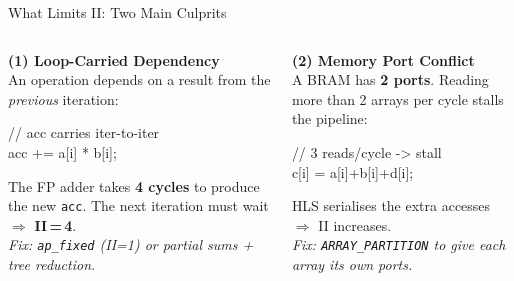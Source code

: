 \documentclass[aspectratio=169,12pt]{beamer}
\begin{document}
\begin{frame}{What Limits II: Two Main Culprits}
\vspace{0.1cm}
\begin{columns}[T,totalwidth=\textwidth]

  \colorbox{Orange!10}{\parbox{\dimexpr\linewidth-2\fboxsep\relax}{\vspace{4pt}
    {\color{Orange}\bfseries\normalsize \textbf{(1)} Loop-Carried Dependency}\\[4pt]
    {\small An operation depends on a result from the \emph{previous} iteration:}
    \vspace{2pt}
    \colorbox{NavyDk!6}{\parbox{\dimexpr\linewidth-4\fboxsep\relax}{\vspace{2pt}
      {\ttfamily\small\color{MidGray}// acc carries iter-to-iter}\\
      {\ttfamily\small acc += a[i] * b[i];}
    \vspace{2pt}}}
    {\small\color{Navy} The FP adder takes \textbf{4 cycles} to produce the new \texttt{acc}.
    The next iteration must wait $\Rightarrow$ \textbf{II\,=\,4}.}\\[4pt]
    {\small\itshape\color{MidGray}Fix: \texttt{ap\_fixed} (II=1) or partial sums + tree reduction.}
  \vspace{4pt}}}


  \colorbox{Teal!10}{\parbox{\dimexpr\linewidth-2\fboxsep\relax}{\vspace{4pt}
    {\color{Teal}\bfseries\normalsize \textbf{(2)} Memory Port Conflict}\\[4pt]
    {\small A BRAM has \textbf{2 ports}. Reading more than 2 arrays per cycle stalls the pipeline:}
    \vspace{2pt}
    \colorbox{NavyDk!6}{\parbox{\dimexpr\linewidth-4\fboxsep\relax}{\vspace{2pt}
      {\ttfamily\small\color{MidGray}// 3 reads/cycle -> stall}\\
      {\ttfamily\small c[i] = a[i]+b[i]+d[i];}
    \vspace{2pt}}}
    {\small\color{Navy} HLS serialises the extra accesses $\Rightarrow$ II increases.}\\[4pt]
    {\small\itshape\color{MidGray}Fix: \texttt{ARRAY\_PARTITION} to give each array its own ports.}
  \vspace{4pt}}}

\end{columns}


\end{frame}
\end{document}

